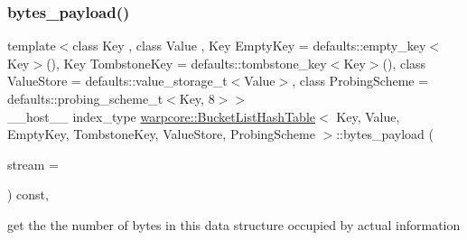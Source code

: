 \subsubsection{\texorpdfstring{bytes\+\_\+payload()}{bytes\_payload()}}
{\footnotesize\ttfamily template$<$class Key , class Value , Key Empty\+Key = defaults\+::empty\+\_\+key$<$\+Key$>$(), Key Tombstone\+Key = defaults\+::tombstone\+\_\+key$<$\+Key$>$(), class Value\+Store  = defaults\+::value\+\_\+storage\+\_\+t$<$\+Value$>$, class Probing\+Scheme  = defaults\+::probing\+\_\+scheme\+\_\+t$<$\+Key, 8$>$$>$ \\
\+\_\+\+\_\+host\+\_\+\+\_\+ index\+\_\+type \hyperlink{classwarpcore_1_1BucketListHashTable}{warpcore\+::\+Bucket\+List\+Hash\+Table}$<$ Key, Value, Empty\+Key, Tombstone\+Key, Value\+Store, Probing\+Scheme $>$\+::bytes\+\_\+payload (\begin{DoxyParamCaption}\item[{const cuda\+Stream\+\_\+t}]{stream = {} }\end{DoxyParamCaption}) const\hspace{0.3cm}{\ttfamily [inline]}, {\ttfamily [noexcept]}}



get the the number of bytes in this data structure occupied by actual information 


